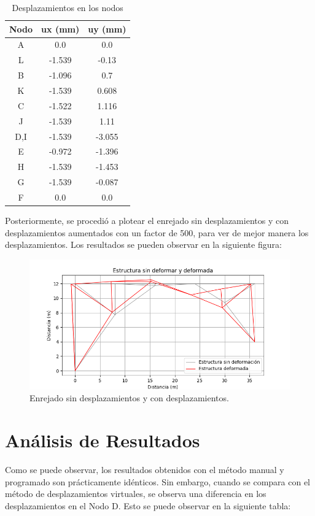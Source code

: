 \documentclass{article}  %
\begin{document}
\begin{table}[h!]
  \centering
  \begin{tabular}{|c|c|c|}
  \hline
  \textbf{Nodo} & \textbf{ux (mm)} & \textbf{uy (mm)} \\
  \hline
  A  & 0.0    & 0.0    \\
  L  & -1.539 & -0.13  \\
  B  & -1.096 & 0.7    \\
  K  & -1.539 & 0.608  \\
  C  & -1.522 & 1.116  \\
  J  & -1.539 & 1.11   \\
  D,I  & -1.539 & -3.055 \\
  E  & -0.972 & -1.396 \\
  H  & -1.539 & -1.453 \\
  G & -1.539 & -0.087 \\
  F & 0.0    & 0.0    \\
  \hline
  \end{tabular}
  \caption{Desplazamientos en los nodos}
\end{table}

\newpage
Posteriormente, se procedió a plotear el enrejado sin desplazamientos y con desplazamientos aumentados con un factor de 500, para ver de mejor manera los desplazamientos. Los resultados se pueden observar en la siguiente figura:
\begin{figure}[h]
  \centering
  \includegraphics[width=1\textwidth]{imagenes/E0_matplotlib.png}
  \caption{Enrejado sin desplazamientos y con desplazamientos.}
  \label{fig:1}
\end{figure}

\newpage
\section{Análisis de Resultados}
Como se puede observar, los resultados obtenidos con el método manual y programado son prácticamente idénticos. Sin embargo, cuando se compara con el método de desplazamientos virtuales, se observa una diferencia en los desplazamientos en el Nodo D. Esto se puede observar en la siguiente tabla:
\end{document}
